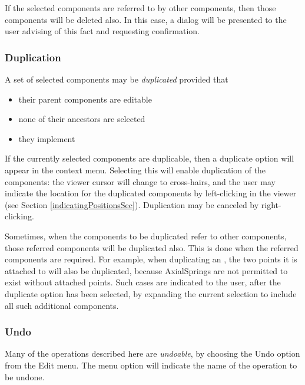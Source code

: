 \documentclass{article}
\begin{document}
If the selected components are referred to by other components, then
those components will be deleted also. In this case, a dialog will be
presented to the user advising of this fact and requesting
confirmation.

\subsubsection{Duplication}

A set of selected components may be {\it duplicated} provided that

\begin{itemize}

\item their parent components are editable

\item none of their ancestors are selected

\item they implement 

\end{itemize}

If the currently selected components are duplicable, then a
{\sf duplicate} option will appear in the context menu. Selecting this
will enable duplication of the components: the viewer cursor will
change to cross-hairs, and the user may indicate the location for the
duplicated components by left-clicking in the viewer
(see Section \ref{indicatingPositionsSec}).  Duplication may
be canceled by right-clicking.

Sometimes, when the components to be duplicated refer to other
components, those referred components will be duplicated also.  This is
done when the referred components are required.  For example, when
duplicating an , the two
points it is attached to will also be duplicated, because AxialSprings
are not permitted to exist without attached points.  Such cases are
indicated to the user, after the {\sf duplicate} option has been selected,
by expanding the current selection to include all such additional
components.

\subsubsection{Undo}

Many of the operations described here are {\it undoable}, by choosing the
{\sf Undo} option from the {\sf Edit} menu. The menu option will indicate the
name of the operation to be undone.
\end{document}
